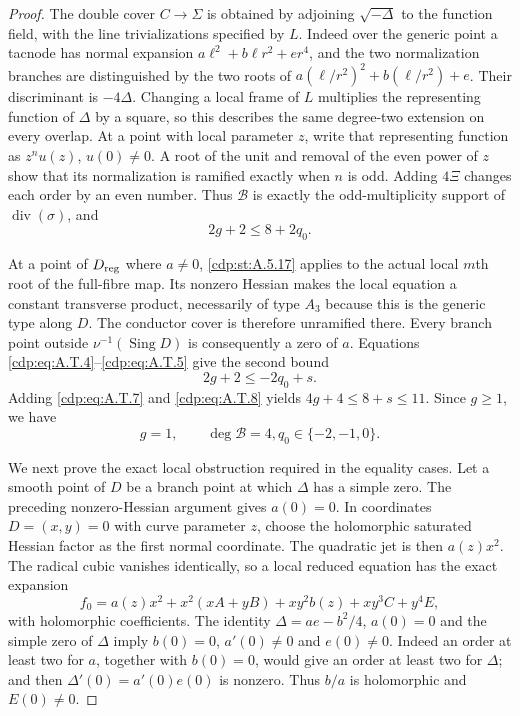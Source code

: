 \begin{proof}
The double cover $C\to\Sigma$ is obtained by adjoining
$\sqrt{-\Delta}$ to the function field, with the line
trivializations specified by $L$. Indeed over the
generic point a tacnode has normal expansion
$a\ell^2+b\ell r^2+er^4$, and the two normalization
branches are distinguished by the two roots of
$a(\ell/r^2)^2+b(\ell/r^2)+e$. Their discriminant
is $-4\Delta$. Changing a local frame of $L$ multiplies
the representing function of $\Delta$ by a square,
so this describes the same degree-two extension on
every overlap. At a point with local parameter $z$,
write that representing function as $z^n u(z)$,
$u(0)\ne0$. A root of the unit and removal of the
even power of $z$ show that its normalization is
ramified exactly when $n$ is odd. Adding $4\Xi$ changes
each order by an even number. Thus $\mathcal B$ is
exactly the odd-multiplicity support of
$\operatorname{div}(\sigma)$, and
\[
                  2g+2\le 8+2q_0.                 \tag{A.T.7}\label{cdp:eq:A.T.7}
\]

At a point of $D_{\rm reg}$ where $a\ne0$, \ref{cdp:st:A.5.17}
applies to the actual local $m$th root of the full-fibre
map. Its nonzero Hessian makes the local equation a
constant transverse product, necessarily of type
$A_3$ because this is the generic type along $D$.
The conductor cover is therefore unramified there.
Every branch point outside $\nu^{-1}(\operatorname{Sing}D)$
is consequently a zero of $a$. Equations \eqref{cdp:eq:A.T.4}--\eqref{cdp:eq:A.T.5}
give the second bound
\[
                    2g+2\le -2q_0+s.              \tag{A.T.8}\label{cdp:eq:A.T.8}
\]
Adding \eqref{cdp:eq:A.T.7} and \eqref{cdp:eq:A.T.8} yields
$4g+4\le8+s\le11$. Since $g\ge1$, we have
\[
           g=1,\qquad \deg\mathcal B=4,
                    q_0\in\{-2,-1,0\}.            \tag{A.T.9}\label{cdp:eq:A.T.9}
\]

We next prove the exact local obstruction required in
the equality cases. Let a smooth point of $D$ be a
branch point at which $\Delta$ has a simple zero.
The preceding nonzero-Hessian argument gives $a(0)=0$.
In coordinates $D=(x,y)=0$ with curve parameter $z$,
choose the holomorphic saturated Hessian factor as the
first normal coordinate. The quadratic jet is then
$a(z)x^2$. The radical cubic vanishes identically,
so a local reduced equation has the exact expansion
\[
 f_0=a(z)x^2+x^2(xA+yB)+xy^2b(z)+xy^3C+y^4E,
                                                        \tag{A.T.10}\label{cdp:eq:A.T.10}
\]
with holomorphic coefficients. The identity
$\Delta=ae-b^2/4$, $a(0)=0$ and the simple zero of
$\Delta$ imply $b(0)=0$, $a'(0)\ne0$ and $e(0)\ne0$.
Indeed an order at least two for $a$, together with
$b(0)=0$, would give an order at least two for $\Delta$;
and then $\Delta'(0)=a'(0)e(0)$ is nonzero.
Thus $b/a$ is holomorphic and $E(0)\ne0$.


\end{proof}
